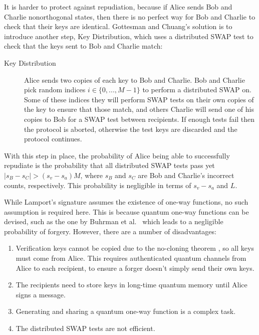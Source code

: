 \documentclass[%
 reprint,
 amsmath,amssymb,
 aps,
 pra,
]{revtex4-1}
\begin{document}
It is harder to protect against repudiation, because if Alice sends Bob and Charlie nonorthogonal states, then there is no perfect way for Bob and Charlie to check that their keys are identical. Gottesman and Chuang's solution is to introduce another step, Key Distribution, which uses a distributed SWAP test to check that the keys sent to Bob and Charlie match:

\begin{description}
\item[Key Distribution]Alice sends two copies of each key to Bob and Charlie. Bob and Charlie pick random indices $i \in \{0,...,M-1\}$ to perform a distributed SWAP on. Some of these indices they will perform SWAP tests on their own copies of the key to ensure that those match, and others Charlie will send one of his copies to Bob for a SWAP test between recipients. If enough tests fail then the protocol is aborted, otherwise the test keys are discarded and the protocol continues.
\end{description}

With this step in place, the probability of Alice being able to successfully repudiate is the probability that all distributed SWAP tests pass yet $|s_B - s_C| > (s_v - s_a)M$, where $s_B$ and $s_C$ are Bob and Charlie's incorrect counts, respectively. This probability is negligible in terms of $s_v - s_a$ and $L$.

While Lamport's signature assumes the existence of one-way functions, no such assumption is required here. This is because quantum one-way functions can be devised, such as the one by Buhrman et al.~\cite{PhysRevLett.87.167902} which leads to a negligible probability of forgery. However, there are a number of disadvantages:

\begin{enumerate}
\item Verification keys cannot be copied due to the no-cloning theorem \cite{WZ82}, so all keys must come from Alice. This requires authenticated quantum channels from Alice to each recipient, to ensure a forger doesn't simply send their own keys.
\item The recipients need to store keys in long-time quantum memory until Alice signs a message.
\item Generating and sharing a quantum one-way function is a complex task.
\item The distributed SWAP tests are not efficient.
\end{enumerate}
\end{document}
